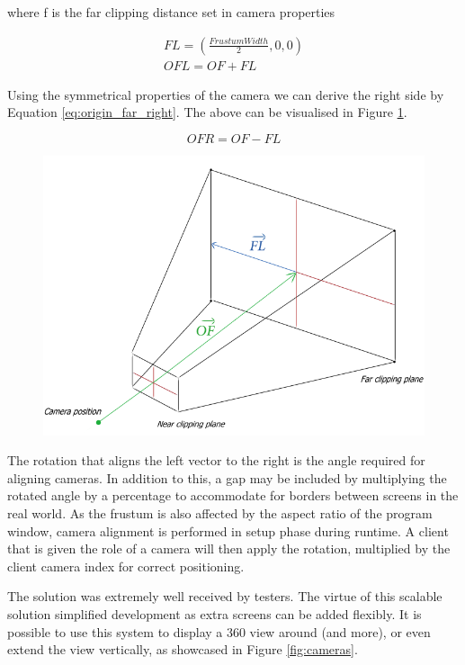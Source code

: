 \documentclass[a4paper,11pt]{article}
\begin{document}
where f is the far clipping distance set in camera properties

\begin{align*}
	FL  = \left( \frac{Frustum Width}{2}, 0, 0 \right) \\
	OFL = OF + FL
\end{align*}

Using the symmetrical properties of the camera we can derive the right side by Equation \ref{eq:origin_far_right}. The above can be visualised in Figure \ref{fig:frustum}.

\begin{equation}
	OFR = OF - FL \label{eq:origin_far_right}
\end{equation}

\begin{figure}[ht]
	\centering
	\includegraphics[scale=0.4]{images/frustum}
    \label{fig:frustum}
\end{figure}

The rotation that aligns the left vector to the right is the angle required for aligning cameras. In addition to this, a gap may be included by multiplying the rotated angle by a percentage to accommodate for  borders between screens in the real world. As the frustum is also affected by the aspect ratio of the program window, camera alignment is performed in setup phase during runtime. A client that is given the role of a camera will then apply the rotation, multiplied by the client camera index for correct positioning.

The solution was extremely well received by testers. The virtue of this scalable solution simplified development as extra screens can be added flexibly. It is possible to use this system to display a 360 view around (and more), or even extend the view vertically, as showcased in Figure \ref{fig:cameras}.
\end{document}
